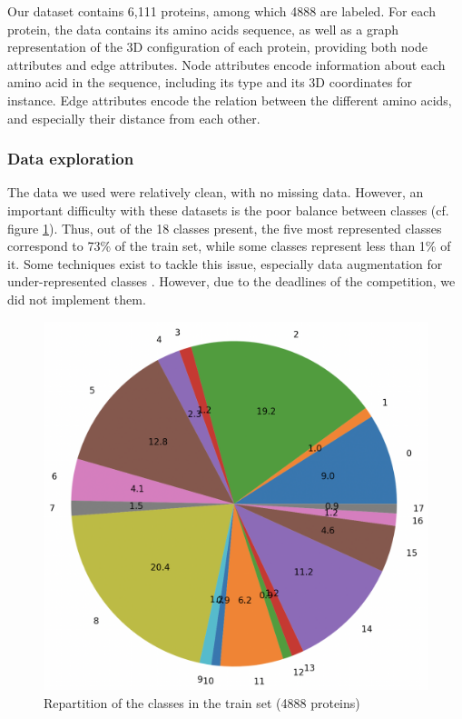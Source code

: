 \documentclass[final]{cvpr}
\begin{document}
 Our dataset contains 6,111 proteins, among which 4888 are labeled. For each protein, the data contains its amino acids sequence, as well as a graph representation of the 3D configuration of each protein, providing both node attributes and edge attributes. Node attributes encode information about each amino acid in the sequence, including its type and its 3D coordinates for instance. Edge attributes encode the relation between the different amino acids, and especially their distance from each other.  

\subsubsection{Data exploration}

The data we used were relatively clean, with no missing data. However, an important difficulty with these datasets is the poor balance between classes (cf. figure \ref{fig:dataExploration}). Thus, out of the 18 classes present, the five most represented classes correspond to 73\% of the train set, while some classes represent less than 1\% of it. Some techniques exist to tackle this issue, especially data augmentation for under-represented classes \cite{Rana2022}. However, due to the deadlines of the competition, we did not implement them.

\begin{figure}[h]
    \centering
    \includegraphics[width=0.8\columnwidth]{figures/dataExploration.png}
    \caption{Repartition of the classes in the train set (4888 proteins)}
    \label{fig:dataExploration}
\end{figure}
\end{document}
